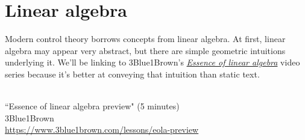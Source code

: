 
\chapter{Linear algebra}

Modern control theory borrows concepts from linear algebra. At first, linear
algebra may appear very abstract, but there are simple geometric intuitions
underlying it. We'll be linking to 3Blue1Brown's
\href{https://www.3blue1brown.com/topics/linear-algebra}{\textit{Essence of
linear algebra}} video series because it's better at conveying that intuition
than static text.
\begin{bookfigure}
   \\
  ``Essence of linear algebra preview" (5 minutes) \\
  \footnotesize 3Blue1Brown \\
  \url{https://www.3blue1brown.com/lessons/eola-preview}
\end{bookfigure}

\renewcommand*{\chapterpath}{\partpath/linear-algebra}












